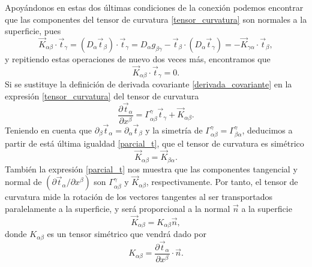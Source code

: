 Apoyándonos en estas dos últimas condiciones de la conexión podemos encontrar que
las componentes del tensor de curvatura \eqref{tensor_curvatura} son normales
a la superficie, pues
\begin{equation}
\vec{K}_{\alpha\beta}\cdot \vec{t}_{\gamma}=(D_{\alpha}\vec{t}_{\beta})\cdot\vec{t}_{\gamma}=D_{\alpha}g_{\beta\gamma}-\vec{t}_{\beta}\cdot(D_{\alpha}\vec{t}_{\gamma})=-\vec{K}_{\gamma\alpha}\cdot \vec{t}_{\beta},
\end{equation}
y repitiendo estas operaciones de nuevo dos veces más, encontramos que
\begin{equation*}
\vec{K}_{\alpha\beta}\cdot \vec{t}_{\gamma}=0.
\end{equation*}
Si se sustituye la definición de derivada covariante \eqref{derivada_covariante} en la expresión
\eqref{tensor_curvatura} del tensor de curvatura 
\begin{equation}\label{parcial_t}
\frac{\partial \vec{t}_{\alpha}}{\partial x^{\beta}}=\Gamma^{\gamma}_{\alpha\beta}\vec{t}_{\gamma}+\vec{K}_{\alpha\beta}.
\end{equation}
Teniendo en cuenta que $\partial_{\beta} \vec{t}_{\alpha}=\partial_{\alpha}
\vec{t}_{\beta}$  y la simetría de
$\Gamma^{\gamma}_{\alpha\beta}=\Gamma^{\gamma}_{\beta\alpha}$, deducimos a
partir de está última igualdad \eqref{parcial_t}, que el tensor de curvatura es simétrico 
\begin{equation*}
\vec{K}_{\alpha\beta}=\vec{K}_{\beta\alpha}.
\end{equation*}
También la expresión \eqref{parcial_t} nos muestra que las componentes
tangencial y normal de
$(\partial \vec{t}_{\alpha}/\partial x^{\beta})$ son $\Gamma^{\gamma}_{\alpha\beta}$  y 
$\vec{K}_{\alpha\beta}$, respectivamente. Por tanto, el tensor de curvatura
mide la rotación de los vectores tangentes al ser transportados paralelamente
a la superficie, y será proporcional a la normal $\vec{n}$ a la superficie
\begin{equation*}
 \vec{K}_{\alpha\beta}=K_{\alpha\beta}\vec{n},
\end{equation*}
donde $K_{\alpha\beta}$ es un tensor simétrico que vendrá dado por
\begin{equation}\label{K_alfa_beta}
K_{\alpha\beta}=\frac{\partial \vec{t}_{\alpha}}{\partial x^{\beta}}\cdot\vec{n}. 
\end{equation}

